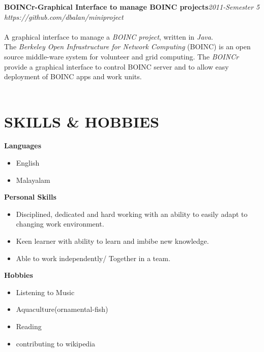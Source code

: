 \documentclass[line,margin]{res}
\begin{document}
\begin{resume}
              {\bf BOINCr-Graphical Interface to manage BOINC projects}\hfill {\it 2011-Semester 5}\\
	          {\it https://github.com/dbalan/miniproject}\\\\
	     	  A graphical interface to manage a {\it BOINC project}, written in {\it Java}.\\
	     	  The {\it Berkeley Open Infrastructure for Network Computing }(BOINC) is an open source middle-ware system for volunteer and grid computing. The {\it BOINCr} provide a graphical interface to control BOINC server and to allow easy deployment of BOINC apps and work units.\\\\	
	                 
	  \section{SKILLS \& HOBBIES}
	          {\bf Languages}
	          \begin{itemize} \itemsep -2pt
	          \item English
	          \item Malayalam
	          \end{itemize}
	          {\bf Personal Skills}
	          \begin{itemize} \itemsep -2pt
	          \item Disciplined, dedicated and hard working with an ability to easily adapt to changing work environment.
	          \item Keen learner with ability to learn and imbibe new knowledge.
	          \item Able to work independently/ Together in a team.
	          \end{itemize}
	          {\bf Hobbies}
	          \begin{itemize} \itemsep -2pt
	          \item Listening to Music
	          \item Aquaculture(ornamental-fish)
	          \item Reading
	          \item contributing to wikipedia 
	          \end{itemize}
	          \vspace{10 mm}                                 
\pagebreak          

\end{resume}
\end{document}
